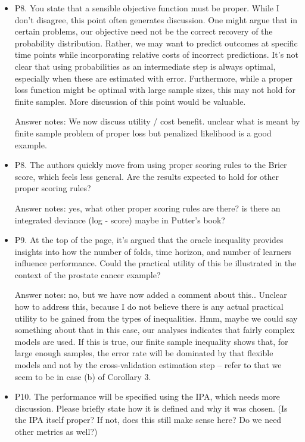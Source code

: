 \documentclass[a4paper,danish]{article}
\newcommand{\1}{\mathds{1}}
\begin{document}
\begin{itemize}
\item P8. You state that a sensible objective function must be
proper. While I don't disagree, this point often generates
discussion. One might argue that in certain problems, our objective
need not be the correct recovery of the probability
distribution. Rather, we may want to predict outcomes at specific
time points while incorporating relative costs of incorrect
predictions. It's not clear that using probabilities as an
intermediate step is always optimal, especially when these are
estimated with error. Furthermore, while a proper loss function
might be optimal with large sample sizes, this may not hold for
finite samples. More discussion of this point would be valuable.

Answer notes: We now discuss utility / cost benefit. unclear what is
meant by finite sample problem of proper loss but penalized
likelihood is a good example.

\item P8. The authors quickly move from using proper scoring rules to the
Brier score, which feels less general. Are the results expected to
hold for other proper scoring rules?

Answer notes: yes, what other proper scoring rules are there? is
there an integrated deviance (log - score) maybe in Putter's book?

\item P9. At the top of the page, it's argued that the oracle inequality
provides insights into how the number of folds, time horizon, and
number of learners influence performance. Could the practical
utility of this be illustrated in the context of the prostate cancer
example?

Answer notes: no, but we have now added a comment about
this.. Unclear how to address this, because I do not believe there
is any actual practical utility to be gained from the types of
inequalities. Hmm, maybe we could say something about that in this
case, our analyses indicates that fairly complex models are used. If
this is true, our finite sample inequality shows that, for large
enough samples, the error rate will be dominated by that flexible
models and not by the cross-validation estimation step -- refer to
that we seem to be in case (b) of Corollary 3.

\item P10. The performance will be specified using the IPA, which needs
more discussion. Please briefly state how it is defined and why it
was chosen. (Is the IPA itself proper? If not, does this still make
sense here? Do we need other metrics as well?)



\end{itemize}
\end{document}
